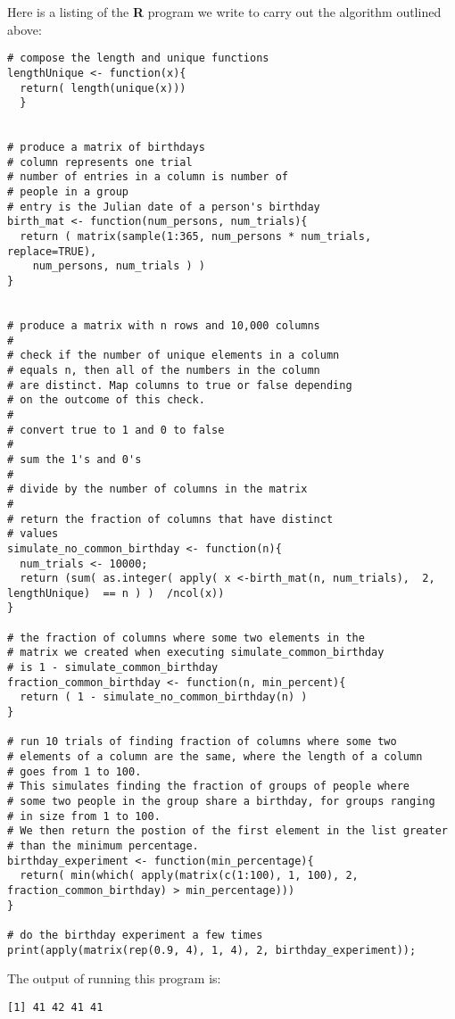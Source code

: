 \documentclass[a4paper,11pt]{article}
\begin{document}
Here is a listing of the \textbf{\textsf{R}} program we write to
carry out the algorithm outlined above:

\begin{lstlisting}
# compose the length and unique functions
lengthUnique <- function(x){
  return( length(unique(x)))
  }


# produce a matrix of birthdays
# column represents one trial
# number of entries in a column is number of
# people in a group
# entry is the Julian date of a person's birthday
birth_mat <- function(num_persons, num_trials){
  return ( matrix(sample(1:365, num_persons * num_trials, replace=TRUE), 
    num_persons, num_trials ) )
}


# produce a matrix with n rows and 10,000 columns
# 
# check if the number of unique elements in a column
# equals n, then all of the numbers in the column
# are distinct. Map columns to true or false depending
# on the outcome of this check.
#
# convert true to 1 and 0 to false
#
# sum the 1's and 0's
#
# divide by the number of columns in the matrix
# 
# return the fraction of columns that have distinct
# values
simulate_no_common_birthday <- function(n){
  num_trials <- 10000;
  return (sum( as.integer( apply( x <-birth_mat(n, num_trials),  2, lengthUnique)  == n ) )  /ncol(x))
}

# the fraction of columns where some two elements in the
# matrix we created when executing simulate_common_birthday
# is 1 - simulate_common_birthday
fraction_common_birthday <- function(n, min_percent){
  return ( 1 - simulate_no_common_birthday(n) )
}

# run 10 trials of finding fraction of columns where some two
# elements of a column are the same, where the length of a column
# goes from 1 to 100.
# This simulates finding the fraction of groups of people where 
# some two people in the group share a birthday, for groups ranging
# in size from 1 to 100.
# We then return the postion of the first element in the list greater 
# than the minimum percentage.
birthday_experiment <- function(min_percentage){
  return( min(which( apply(matrix(c(1:100), 1, 100), 2, fraction_common_birthday) > min_percentage)))
}

# do the birthday experiment a few times
print(apply(matrix(rep(0.9, 4), 1, 4), 2, birthday_experiment));

\end{lstlisting}

The output of running this program is:

\begin{lstlisting}
[1] 41 42 41 41
\end{lstlisting}
\end{document}
